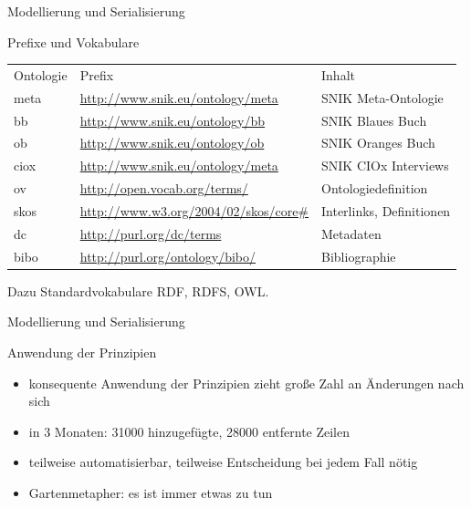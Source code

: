 \documentclass[14pt,aspectratio=1610]{beamer}
\begin{document}
\begin{frame}{Modellierung und Serialisierung}
\begin{block}{Prefixe und Vokabulare}
\small
\begin{tabular}{lll}
Ontologie	&Prefix						&Inhalt\\
meta		&\url{http://www.snik.eu/ontology/meta}		&SNIK Meta-Ontologie\\
bb		&\url{http://www.snik.eu/ontology/bb}		&SNIK Blaues Buch\\
ob		&\url{http://www.snik.eu/ontology/ob}		&SNIK Oranges Buch\\
ciox		&\url{http://www.snik.eu/ontology/meta}		&SNIK CIOx Interviews\\
ov		&\url{http://open.vocab.org/terms/}		&Ontologiedefinition\\
skos		&\url{http://www.w3.org/2004/02/skos/core\#}	&Interlinks, Definitionen\\
dc		&\url{http://purl.org/dc/terms}			&Metadaten\\
bibo		&\url{http://purl.org/ontology/bibo/}		&Bibliographie\\
\end{tabular}
Dazu Standardvokabulare RDF, RDFS, OWL.
\end{block}
\end{frame}

\begin{frame}{Modellierung und Serialisierung}
\begin{block}{Anwendung der Prinzipien}
\begin{itemize}
\item konsequente Anwendung der Prinzipien zieht große Zahl an Änderungen nach sich
\item in 3 Monaten: 31000 hinzugefügte, 28000 entfernte Zeilen
\item teilweise automatisierbar, teilweise Entscheidung bei jedem Fall nötig
\item Gartenmetapher: es ist immer etwas zu tun
\end{itemize}
\end{block}
\end{frame}
\end{document}
